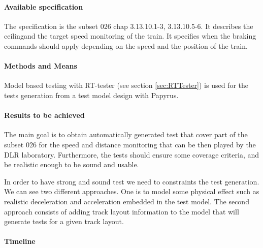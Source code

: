 \paragraph{Available specification}

The specification is the subset 026 chap 3.13.10.1-3, 3.13.10.5-6.
It describes the ceilingand the target speed monitoring of the
train. It specifies when the braking commands should apply depending
on the speed and the position of the train.

\paragraph{Methods and Means}

Model based testing with RT-tester (see section \ref{sec:RTTester}) is used for the tests generation
from a test model design with Papyrus.



\paragraph{Results to be achieved}

The main goal is to obtain automatically generated test that cover
part of the subset 026 for the speed and distance monitoring that can
be then played by the DLR laboratory.
Furthermore, the tests should ensure some coverage criteria, and be
realistic enough to be sound and usable.

In order to have strong and sound test we need to constraints the test
generation. We can see two different approaches. One is to model some physical effect
such as realistic deceleration and acceleration embedded in the test
model.
The second approach consists of adding track layout information to the
model that will generate tests for a given track layout.


\paragraph{Timeline}


